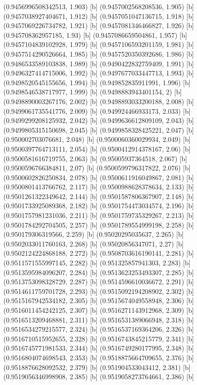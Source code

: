 {{{(0.9456996508342513, 1.903) [b] 
(0.9457002568208536, 1.905) [b] 
(0.9457038927404671, 1.912) [b] 
(0.9457051047136715, 1.918) [b] 
(0.9457069226734782, 1.921) [b] 
(0.9457081346466827, 1.926) [b] 
(0.945708362957185, 1.93) [b] 
(0.9457086659504861, 1.957) [b] 
(0.9457104839102928, 1.979) [b] 
(0.9457106593201159, 1.981) [b] 
(0.9457514290526664, 1.985) [b] 
(0.9457520350392686, 1.986) [b] 
(0.9486533589103838, 1.989) [b] 
(0.9490422832759409, 1.991) [b] 
(0.9496327414715006, 1.992) [b] 
(0.9497677033447713, 1.993) [b] 
(0.9498520545155656, 1.994) [b] 
(0.949852835911991, 1.996) [b] 
(0.9498546538717977, 1.999) [b] 
(0.9498883943401154, 2) [b] 
(0.9498890003267176, 2.002) [b] 
(0.9498893033200188, 2.008) [b] 
(0.9499061735541776, 2.009) [b] 
(0.949924466933173, 2.033) [b] 
(0.9499299208125932, 2.042) [b] 
(0.9499636612809109, 2.043) [b] 
(0.9499805315150698, 2.045) [b] 
(0.9499858328425221, 2.047) [b] 
(0.950002703076681, 2.048) [b] 
(0.9500060360029934, 2.049) [b] 
(0.9500397764713111, 2.054) [b] 
(0.9500412914378167, 2.06) [b] 
(0.9500581616719755, 2.063) [b] 
(0.95005937364518, 2.067) [b] 
(0.9500596766384811, 2.07) [b] 
(0.9500599796317822, 2.076) [b] 
(0.9500602826250834, 2.078) [b] 
(0.9500611916049867, 2.081) [b] 
(0.9500801413766762, 2.117) [b] 
(0.9500988628378634, 2.133) [b] 
(0.9501261322349642, 2.144) [b] 
(0.9501587806367907, 2.148) [b] 
(0.9501733925089368, 2.182) [b] 
(0.9501754473034574, 2.196) [b] 
(0.9501757981231036, 2.211) [b] 
(0.9501759735329267, 2.213) [b] 
(0.9501784292704505, 2.257) [b] 
(0.9501789554999198, 2.258) [b] 
(0.950179306319566, 2.259) [b] 
(0.95020295035637, 2.265) [b] 
(0.9502033011760163, 2.268) [b] 
(0.95020856347071, 2.27) [b] 
(0.9502124224868188, 2.272) [b] 
(0.9508703616190141, 2.281) [b] 
(0.9511571555997145, 2.282) [b] 
(0.951325857941303, 2.283) [b] 
(0.9513595984096207, 2.284) [b] 
(0.9513623253493307, 2.285) [b] 
(0.9513753098328729, 2.287) [b] 
(0.9514596610036672, 2.291) [b] 
(0.9514611759701728, 2.293) [b] 
(0.9515092194208902, 2.302) [b] 
(0.9515167942534182, 2.305) [b] 
(0.9515674049558948, 2.306) [b] 
(0.9516011454242125, 2.307) [b] 
(0.9516271143912968, 2.309) [b] 
(0.9516513209468881, 2.311) [b] 
(0.9516531389066948, 2.318) [b] 
(0.9516534279215577, 2.324) [b] 
(0.9516537169364206, 2.326) [b] 
(0.9516710515952655, 2.328) [b] 
(0.9516743845215779, 2.341) [b] 
(0.9516745771981533, 2.344) [b] 
(0.9516749280177995, 2.348) [b] 
(0.9516804074698543, 2.353) [b] 
(0.9518875664709655, 2.376) [b] 
(0.9518876628092532, 2.379) [b] 
(0.951904533043412, 2.381) [b] 
(0.9519056346998908, 2.385) [b] 
(0.9519058273764661, 2.386) [b] 
}}}
